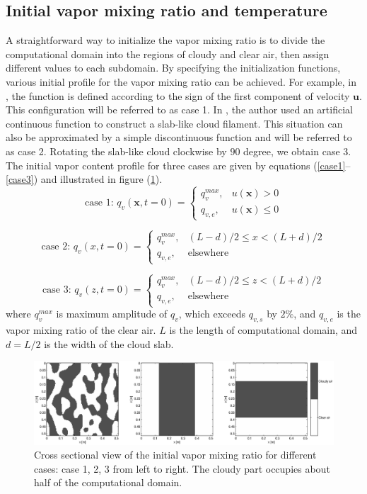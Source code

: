 \documentclass[12pt]{article}
\begin{document}
\subsection{Initial vapor mixing ratio and temperature}
A straightforward way to initialize the vapor mixing ratio is to divide the computational domain into the regions of cloudy and clear air, then assign different values to each subdomain. By specifying the initialization functions, various initial profile for the vapor mixing ratio can be achieved. For example, in \cite{And04}, the function is defined according to the sign of the first component of velocity $\mathbf{u}$. This configuration will be referred to as case 1. In \cite{Kumar11}, the author used an artificial continuous function to construct a slab-like cloud filament. This situation can also be approximated by a simple discontinuous function and will be referred to as case 2. Rotating the slab-like cloud clockwise by $90$ degree, we obtain case 3. The initial vapor content profile for three cases are given by equations (\ref{case1}--\ref{case3}) and illustrated in figure (\ref{fig:v_field_case123}).
\begin{equation}
\mbox{case 1: } q_v(\mathbf{x},t=0) = 
\begin{cases} 
q_v^{max}, & u(\mathbf{x}) > 0\\
q_{v,e}, & u(\mathbf{x}) \le 0
\end{cases}\label{case1}
\end{equation}

\begin{equation}
\mbox{case 2: } q_v(x,t=0) = 
\begin{cases} 
q_v^{max}, & (L-d)/2 \le x < (L+d)/2\\
q_{v,e}, & \mbox{elsewhere}
\end{cases}\label{case2}
\end{equation}

\begin{equation}
\mbox{case 3: } q_v(z,t=0) = 
\begin{cases} 
q_v^{max}, & (L-d)/2 \le z < (L+d)/2\\
q_{v,e}, & \mbox{elsewhere}
\end{cases}\label{case3}
\end{equation}
where $q_v^{max}$ is maximum amplitude of $q_v$, which exceeds $q_{v,s}$ by $2\%$, and $q_{v,e}$ is the vapor mixing ratio of the clear air. $L$ is the length of computational domain, and $d = L/2$ is the width of the cloud slab. 
\begin{figure}[H]
\includegraphics[width=1.0\textwidth]{Figures/v_field_case123}
\caption{Cross sectional view of the initial vapor mixing ratio for different cases: case 1, 2, 3 from left to right. The cloudy part occupies about half of the computational domain.\label{fig:v_field_case123}}
\end{figure}
\end{document}
